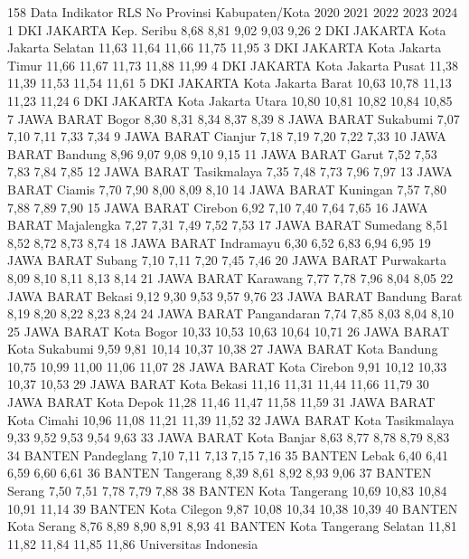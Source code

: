 158
Data Indikator RLS
No Provinsi Kabupaten/Kota 2020 2021 2022 2023 2024
1 DKI JAKARTA Kep. Seribu 8,68 8,81 9,02 9,03 9,26
2 DKI JAKARTA Kota Jakarta Selatan 11,63 11,64 11,66 11,75 11,95
3 DKI JAKARTA Kota Jakarta Timur 11,66 11,67 11,73 11,88 11,99
4 DKI JAKARTA Kota Jakarta Pusat 11,38 11,39 11,53 11,54 11,61
5 DKI JAKARTA Kota Jakarta Barat 10,63 10,78 11,13 11,23 11,24
6 DKI JAKARTA Kota Jakarta Utara 10,80 10,81 10,82 10,84 10,85
7 JAWA BARAT Bogor 8,30 8,31 8,34 8,37 8,39
8 JAWA BARAT Sukabumi 7,07 7,10 7,11 7,33 7,34
9 JAWA BARAT Cianjur 7,18 7,19 7,20 7,22 7,33
10 JAWA BARAT Bandung 8,96 9,07 9,08 9,10 9,15
11 JAWA BARAT Garut 7,52 7,53 7,83 7,84 7,85
12 JAWA BARAT Tasikmalaya 7,35 7,48 7,73 7,96 7,97
13 JAWA BARAT Ciamis 7,70 7,90 8,00 8,09 8,10
14 JAWA BARAT Kuningan 7,57 7,80 7,88 7,89 7,90
15 JAWA BARAT Cirebon 6,92 7,10 7,40 7,64 7,65
16 JAWA BARAT Majalengka 7,27 7,31 7,49 7,52 7,53
17 JAWA BARAT Sumedang 8,51 8,52 8,72 8,73 8,74
18 JAWA BARAT Indramayu 6,30 6,52 6,83 6,94 6,95
19 JAWA BARAT Subang 7,10 7,11 7,20 7,45 7,46
20 JAWA BARAT Purwakarta 8,09 8,10 8,11 8,13 8,14
21 JAWA BARAT Karawang 7,77 7,78 7,96 8,04 8,05
22 JAWA BARAT Bekasi 9,12 9,30 9,53 9,57 9,76
23 JAWA BARAT Bandung Barat 8,19 8,20 8,22 8,23 8,24
24 JAWA BARAT Pangandaran 7,74 7,85 8,03 8,04 8,10
25 JAWA BARAT Kota Bogor 10,33 10,53 10,63 10,64 10,71
26 JAWA BARAT Kota Sukabumi 9,59 9,81 10,14 10,37 10,38
27 JAWA BARAT Kota Bandung 10,75 10,99 11,00 11,06 11,07
28 JAWA BARAT Kota Cirebon 9,91 10,12 10,33 10,37 10,53
29 JAWA BARAT Kota Bekasi 11,16 11,31 11,44 11,66 11,79
30 JAWA BARAT Kota Depok 11,28 11,46 11,47 11,58 11,59
31 JAWA BARAT Kota Cimahi 10,96 11,08 11,21 11,39 11,52
32 JAWA BARAT Kota Tasikmalaya 9,33 9,52 9,53 9,54 9,63
33 JAWA BARAT Kota Banjar 8,63 8,77 8,78 8,79 8,83
34 BANTEN Pandeglang 7,10 7,11 7,13 7,15 7,16
35 BANTEN Lebak 6,40 6,41 6,59 6,60 6,61
36 BANTEN Tangerang 8,39 8,61 8,92 8,93 9,06
37 BANTEN Serang 7,50 7,51 7,78 7,79 7,88
38 BANTEN Kota Tangerang 10,69 10,83 10,84 10,91 11,14
39 BANTEN Kota Cilegon 9,87 10,08 10,34 10,38 10,39
40 BANTEN Kota Serang 8,76 8,89 8,90 8,91 8,93
41 BANTEN Kota Tangerang Selatan 11,81 11,82 11,84 11,85 11,86
Universitas Indonesia

